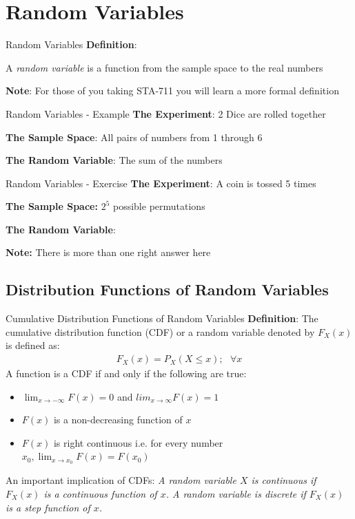 \documentclass{beamer}
\begin{document}
\section{Random Variables}

\begin{frame}{Random Variables}
\textbf{Definition}:
\newline

\begin{center}
A \emph{random variable} is a function from the sample space to the real numbers 
\end{center}
\textbf{Note}: For those of you taking STA-711 you will learn a more formal definition
\end{frame}

\begin{frame}{Random Variables - Example}
\textbf{The Experiment}:
2 Dice are rolled together

\textbf{The Sample Space}:
All pairs of numbers from 1 through 6

\textbf{The Random Variable}:
The sum of the numbers 
\end{frame}

\begin{frame}{Random Variables - Exercise}
\textbf{The Experiment}:
A coin is tossed 5 times


\textbf{The Sample Space:}
$2^{5}$ possible permutations


\textbf{The Random Variable}:


\textbf{Note:} There is more than one right answer here
\end{frame}

\subsection{Distribution Functions of Random Variables}
\begin{frame}{Cumulative Distribution Functions of Random Variables}
\textbf{Definition}:
The cumulative distribution function (CDF) or a random variable denoted by $F_{X}(x)$ is defined as:
\begin{align*}
F_{X}(x) = P_{X}(X \leq x);\>\>\> \forall x
\end{align*}
A function is a CDF if and only if the following are true:
\begin{itemize}
\item{$\lim_{x \rightarrow -\infty}F(x) = 0$ and $lim_{x \rightarrow \infty}F(x) = 1$}
\item{$F(x)$ is a non-decreasing function of $x$}
\item{$F(x)$ is right continuous i.e. for every number $x_{0}, \lim_{x\rightarrow x_{0}} F(x) = F(x_{0})$} 
\end{itemize}
An important implication of CDFs: \textit{A random variable $X$ is continuous if $F_{X}(x)$ is a continuous function of $x$. A random variable is discrete if $F_{X}(x)$ is a step function of $x$. }
\end{frame}
\end{document}
